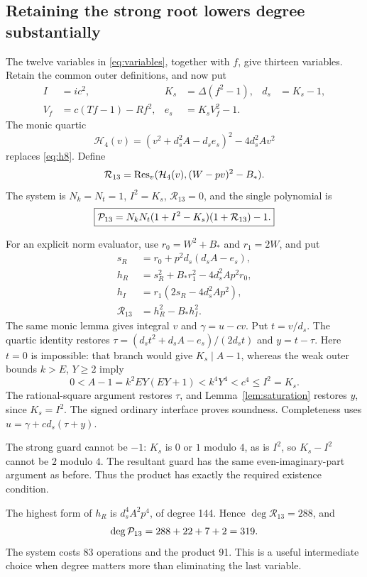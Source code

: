 \documentclass[11pt,letterpaper]{article}
\theoremstyle{remark}\newtheorem{remark}[theorem]{Remark}
\begin{document}
\subsection{Retaining the strong root lowers degree substantially}
The twelve variables in \eqref{eq:variables}, together with $f$, give
thirteen variables.
Retain the common outer definitions, and now put
\begin{align*}
 I&=ic^2,&K_s&=\Delta(f^2-1),&d_s&=K_s-1,\\
 V_f&=c(Tf-1)-Rf^2,&e_s&=K_sV_f^2-1.
\end{align*}
The monic quartic
\[
 \mathcal H_4(v)=(v^2+d_s^2A-d_se_s)^2-4d_s^2Av^2
\]
replaces \eqref{eq:h8}. Define
\[
 \mathcal R_{13}=\operatorname{Res}_v(\mathcal H_4(v),(W-pv)^2-B_*).
\]
The system is $N_k=N_t=1$, $I^2=K_s$, $\mathcal R_{13}=0$, and the single
polynomial is
\begin{equation}\label{eq:thirteen}
 \boxed{\mathcal P_{13}=N_kN_t(1+I^2-K_s)(1+\mathcal R_{13})-1.}
\end{equation}

For an explicit norm evaluator, use $r_0=W^2+B_*$ and $r_1=2W$, and put
\begin{align*}
 s_R&=r_0+p^2d_s(d_sA-e_s),\\
 h_R&=s_R^2+B_*r_1^2-4d_s^2Ap^2r_0,\\
 h_I&=r_1(2s_R-4d_s^2Ap^2),\\
 \mathcal R_{13}&=h_R^2-B_*h_I^2.
\end{align*}
The same monic lemma gives integral $v$ and $\gamma=u-cv$. Put $t=v/d_s$.
The quartic identity restores
$\tau=(d_st^2+d_sA-e_s)/(2d_st)$ and $y=t-\tau$.
Here $t=0$ is impossible: that branch would give $K_s\mid A-1$, whereas
the weak outer bounds $k>E$, $Y\geq2$ imply
\[
 0<A-1=k^2EY(EY+1)<k^4Y^4<c^4\leq I^2=K_s.
\]
The rational-square argument restores $\tau$, and Lemma~\ref{lem:saturation}
restores $y$, since $K_s=I^2$. The signed ordinary interface proves soundness.
Completeness uses $u=\gamma+cd_s(\tau+y)$.

The strong guard cannot be $-1$: $K_s$ is $0$ or $1$ modulo $4$, as is
$I^2$, so $K_s-I^2$ cannot be $2$ modulo $4$. The resultant guard has the
same even-imaginary-part argument as before. Thus the product has exactly
the required existence condition.

The highest form of $h_R$ is $d_s^4A^2p^4$, of degree 144. Hence
$\deg\mathcal R_{13}=288$, and
\[
 \deg\mathcal P_{13}=288+22+7+2=319.
\]
The system costs 83 operations and the product 91. This is a useful
intermediate choice when degree matters more than eliminating the last variable.
\end{document}
